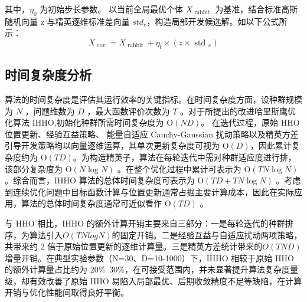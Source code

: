 \documentclass{wzuthesis}
\begin{document}
其中，${\eta }_{0}$ 为初始步长参数。
以当前全局最优个体 ${X}_{\text{ rabbit }}$ 为基准，结合标准高斯随机向量 $\mathrm{z}$ 与精英逐维标准差向量 ${st}{d}_{e}$，构造局部开发候选解。如以下公式所示：
\begin{equation}
    {X}_{\text{ cov }} = {X}_{\text{ rabbit }} + {\eta }_{t} \times  \left( {z \times  {\text{ std }}_{e}}\right) 
\end{equation}

\subsection{时间复杂度分析}
算法的时间复杂度是评估其运行效率的关键指标。在时间复杂度方面，设种群规模为 $N$ ，问题维数为 $D$ ，最大函数评价次数为 $T$ 。对于所提出的改进哈里斯鹰优化算法 IHHO,初始化种群所需时间复杂度为 $\mathrm{O}\left( {ND}\right)$。 在迭代过程，原始 HHO 位置更新、经验互益策略、 能量自适应 Cauchy-Gaussian 扰动策略以及精英方差引导开发策略均以向量逐维运算，其单次更新复杂度可视为 $\mathrm{O}\left( D\right)$，因此累计复杂度约为 $\mathrm{O}\left( {TD}\right)$。为构造精英子，算法在每轮迭代中需对种群适应度进行排，该部分复杂度为 $\mathrm{O}\left( {N\log N}\right)$ 。在整个优化过程中累计可表示为 $\mathrm{O}\left( {{TN}\log N}\right)$ 。综合而言，$\mathrm{{IHHO}}$ 算法的总体时间复杂度可表示为 $\mathrm{O}\left( {{TD} + {TN}\log N}\right)$ 。考虑到连续优化问题中目标函数计算与位置更新通常占据主要计算成本，因此在实际应用，算法的总体时间复杂度通常可近似看作 $\mathrm{O}\left( {TD}\right)$ 。

与 HHO 相比，IHHO 的额外计算开销主要来自三部分：一是每轮迭代的种群排序，为算法引入$O(TNlogN)$的固定开销。二是经验互益与自适应扰动两项策略，共带来约 2 倍于原始位置更新的逐维计算量。三是精英方差统计带来的$O(TND)$增量开销。在典型实验参数（N=30、D=10-1000）下，IHHO 相较于原始 HHO 的额外计算量占比约为 20\%~30\%，在可接受范围内，并未显著提升算法复杂度量级，却有效改善了原始 HHO 易陷入局部最优、后期收敛精度不足等缺陷，在计算开销与优化性能间取得良好平衡。
\end{document}
